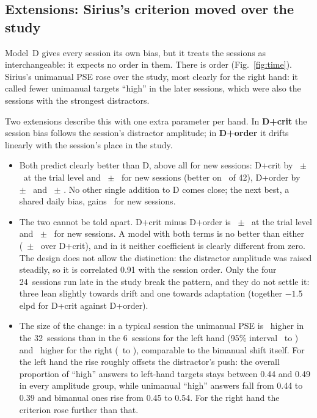 \subsection{Extensions: Sirius's criterion moved over the study}\label{sec:ext}
Model~D gives every session its own bias, but it treats the sessions as interchangeable: it expects no order in them.
There is order (Fig.~\ref{fig:time}).
Sirius's unimanual PSE rose over the study, most clearly for the right hand: it called fewer unimanual targets ``high'' in the later sessions, which were also the sessions with the strongest distractors.

Two extensions describe this with one extra parameter per hand.
In \textbf{D+crit} the session bias follows the session's distractor amplitude; in \textbf{D+order} it drifts linearly with the session's place in the study.
\begin{itemize}
\item Both predict clearly better than D, above all for new sessions: D+crit by \CritvsDTrial\ $\pm$ \CritvsDTrialSE\ at the trial level and \CritvsDLoso\ $\pm$ \CritvsDLosoSE\ for new sessions (better on \CritvsDLosoNbetter\ of 42), D+order by \OrdervsDTrial\ $\pm$ \OrdervsDTrialSE\ and \OrdervsDLoso\ $\pm$ \OrdervsDLosoSE.
No other single addition to D comes close; the next best, a shared daily bias, gains \SharedvsDLoso\ for new sessions.
\item The two cannot be told apart. D+crit minus D+order is \CritvsOrderTrial\ $\pm$ \CritvsOrderTrialSE\ at the trial level and \CritvsOrderLoso\ $\pm$ \CritvsOrderLosoSE\ for new sessions. A model with both terms is no better than either (\CritOrdervsCritLoso\ $\pm$ \CritOrdervsCritLosoSE\ over D+crit), and in it neither coefficient is clearly different from zero.
The design does not allow the distinction: the distractor amplitude was raised steadily, so it is correlated 0.91 with the session order. Only the four 24\um\ sessions run late in the study break the pattern, and they do not settle it: three lean slightly towards drift and one towards adaptation (together $-1.5$ elpd for D+crit against D+order).
\item The size of the change: in a typical session the unimanual PSE is \critPseLeft\um\ higher in the 32\um\ sessions than in the 6\um\ sessions for the left hand (95\% interval \critPseLeftLo\ to \critPseLeftHi) and \critPseRight\um\ higher for the right (\critPseRightLo\ to \critPseRightHi), comparable to the bimanual shift itself.
For the left hand the rise roughly offsets the distractor's push: the overall proportion of ``high'' answers to left-hand targets stays between 0.44 and 0.49 in every amplitude group, while unimanual ``high'' answers fall from 0.44 to 0.39 and bimanual ones rise from 0.45 to 0.54. For the right hand the criterion rose further than that.
\end{itemize}

